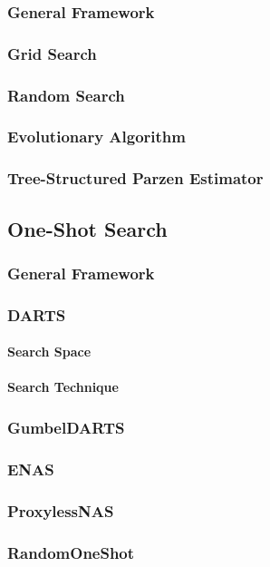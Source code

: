 \subsubsection{General Framework}
\subsubsection{Grid Search}
\subsubsection{Random Search}
\subsubsection{Evolutionary Algorithm}
\subsubsection{Tree-Structured Parzen Estimator}

\subsection{One-Shot Search}
\subsubsection{General Framework}
\subsubsection{DARTS}
\paragraph{Search Space}
\paragraph{Search Technique}
\subsubsection{GumbelDARTS}
\subsubsection{ENAS}
\subsubsection{ProxylessNAS}
\subsubsection{RandomOneShot}


